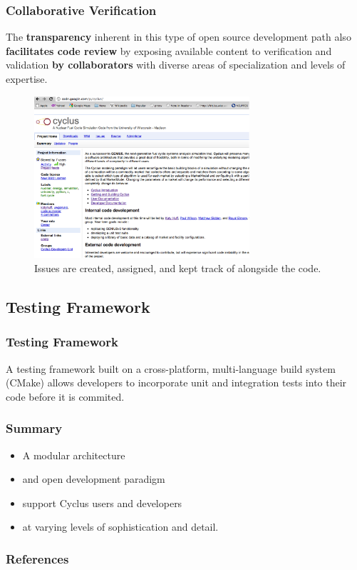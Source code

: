 \documentclass[9pt]{beamer}
\begin{document}
\begin{frame}[ctb!]
  \frametitle{Collaborative Verification}
  The \textbf{transparency} inherent in this type of open source 
    development path also \textbf{facilitates code review}
    by exposing available content to verification and validation 
    \textbf{by collaborators} with diverse areas of specialization and levels 
    of expertise.  
  \begin{figure}[htbp!]
    \begin{center}
      \includegraphics[height=6cm]{cyclushome.eps}
    \end{center}
    \caption{ Issues are created, assigned, and kept track of 
    alongside the code. } 
    \label{fig:issues}
  \end{figure}
\end{frame}
\subsection{Testing Framework}
\begin{frame}[ctb!]
  \frametitle{Testing Framework}
  A testing framework built on a cross-platform, multi-language build 
  system (CMake) allows developers to incorporate unit and integration 
  tests into their code before it is commited.
\end{frame}
\begin{frame}
  \frametitle{Summary}
  \begin{itemize}
    \item A modular architecture 
      \pause
    \item and open development paradigm 
      \pause
    \item support Cyclus users and developers  
      \pause
    \item at varying levels of sophistication and detail. 
  \end{itemize}
\end{frame}
\begin{frame}[allowframebreaks]
  \frametitle{References}
  
  {\footnotesize  }
\end{frame}
\end{document}
